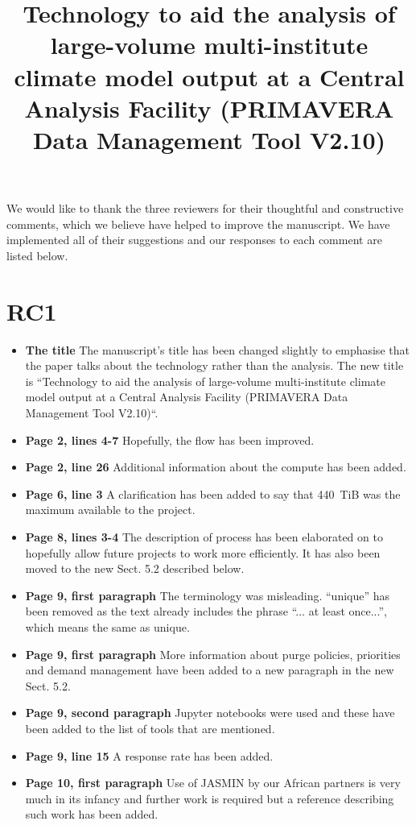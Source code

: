 \documentclass[12pt,a4paper]{article}
\begin{document}
\title{Technology to aid the analysis of large-volume multi-institute climate model output at a Central Analysis Facility (PRIMAVERA Data Management Tool V2.10)}
\maketitle
We would like to thank the three reviewers for their thoughtful and constructive comments, which we believe have helped to improve the manuscript. We have implemented all of their suggestions and our responses to each comment are listed below.

\section{RC1}
\begin{itemize}
\item \textbf{The title} The manuscript's title has been changed slightly to emphasise that the paper talks about the technology rather than the analysis. The new title is ``Technology to aid the analysis of large-volume multi-institute climate model output at a Central Analysis Facility (PRIMAVERA Data Management Tool V2.10)``.

\item \textbf{Page 2, lines 4-7} Hopefully, the flow has been improved.

\item \textbf{Page 2, line 26} Additional information about the compute has been added.

\item \textbf{Page 6, line 3} A clarification has been added to say that 440~TiB was the maximum available to the project.

\item \textbf{Page 8, lines 3-4} The description of process has been elaborated on to hopefully allow future projects to work more efficiently. It has also been moved to the new Sect. 5.2 described below.

\item \textbf{Page 9, first paragraph} The terminology was misleading. ``unique'' has been removed as the text already includes the phrase ``... at least once...'', which means the same as unique. 

\item \textbf{Page 9, first paragraph} More information about purge policies, priorities and demand management have been added to a new paragraph in the new Sect. 5.2.

\item \textbf{Page 9, second paragraph} Jupyter notebooks were used and these have been added to the list of tools that are mentioned.

\item \textbf{Page 9, line 15} A response rate has been added.

\item \textbf{Page 10, first paragraph}  Use of JASMIN by our African partners is very much in its infancy and further work is required but a reference describing such work has been added.
\end{itemize}
\end{document}
